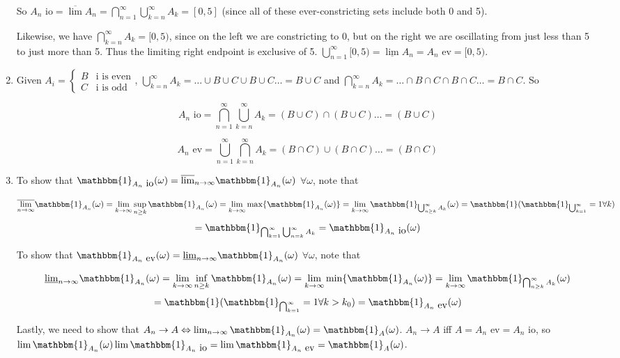 \documentclass[12pt]{article}
\begin{document}
\begin{enumerate}
So $A_n \mbox{ io}=\overline{\lim} A_n = \bigcap^\infty_{n=1} \bigcup_{k=n}^\infty A_k = [0,5]$ (since all of these ever-constricting sets include both 0 and 5).

Likewise, we have $\bigcap^\infty_{k=n} A_k = [0,5)$, since on the left we are constricting to 0, but on the right we are oscillating from just less than 5 to just more than 5. Thus the limiting right endpoint is exclusive of 5. $\bigcup^\infty_{n=1}[0,5)=\underline{\lim} A_n= A_n \mbox{ ev}=[0,5)$.

\item Given $A_i= \begin{cases} B & \mbox{i is even} \\ C & \mbox{i is odd} \end{cases}$, $\bigcup^\infty_{k=n} A_k = \dots \cup B \cup C \cup B \cup C \dots = B \cup C$ and $\bigcap^\infty_{k=n} A_k = \dots \cap B \cap C \cap B \cap C \dots = B \cap C$. So 

$$ A_n \mbox{ io}=\bigcap^\infty_{n=1}\bigcup^\infty_{k=n} A_k = (B \cup C) \cap (B \cup C)\dots = (B \cup C)$$

$$ A_n \mbox{ ev}=\bigcup^\infty_{n=1}\bigcap^\infty_{k=n} A_k = (B \cap C) \cup (B \cap C)\dots = (B \cap C)$$

\item To show that $\mathbbm{1}_{A_n\mbox{ io}}(\omega)=\overline{\lim}_{n\to\infty}\mathbbm{1}_{A_n}(\omega)$ $\forall \omega$, note that 

$$\overline{\lim_{n\to\infty}}\mathbbm{1}_{A_n}(\omega)=\lim_{k \to \infty} \sup_{n \geq k} \mathbbm{1}_{A_n}(\omega)=\lim_{k \to \infty} \max \{\mathbbm{1}_{A_n}(\omega)\}=\lim_{k \to \infty} \mathbbm{1}_{\bigcup^\infty_{n \geq k} A_k}(\omega)=\mathbbm{1}(\mathbbm{1}_{\bigcup^\infty_{k=1}}=1\forall k)$$ $$=\mathbbm{1}_{ \bigcap^\infty_{k=1} \bigcup^\infty_{n=k}A_k} = \mathbbm{1}_{A_n\mbox{ io}}(\omega) $$

To show that $\mathbbm{1}_{A_n\mbox{ ev}}(\omega)=\underline{\lim}_{n\to\infty}\mathbbm{1}_{A_n}(\omega)$ $\forall \omega$, note that 

$$\underline{\lim}_{n\to\infty}\mathbbm{1}_{A_n}(\omega)=\lim_{k \to \infty} \inf_{n \geq k} \mathbbm{1}_{A_n}(\omega)=\lim_{k \to \infty} \min \{\mathbbm{1}_{A_n}(\omega)\}=\lim_{k \to \infty} \mathbbm{1}_{\bigcap^\infty_{n \geq k} A_k}(\omega)$$ $$=\mathbbm{1}(\mathbbm{1}_{\bigcap^\infty_{k=1}}=1\forall k>k_0) = \mathbbm{1}_{A_n\mbox{ ev}}(\omega) $$

Lastly, we need to show that $A_n \to A \Leftrightarrow \lim_{n \to \infty} \mathbbm{1}_{A_n}(\omega)=\mathbbm{1}_{A}(\omega)$. $A_n \to A$ iff $A=A_n\mbox{ ev}=A_n\mbox{ io}$, so $\lim \mathbbm{1}_{A_n}(\omega)\lim \mathbbm{1}_{A_n\mbox{ io}}=\lim \mathbbm{1}_{A_n\mbox{ ev}}=\mathbbm{1}_{A}(\omega)$.


\end{enumerate}
\end{document}
